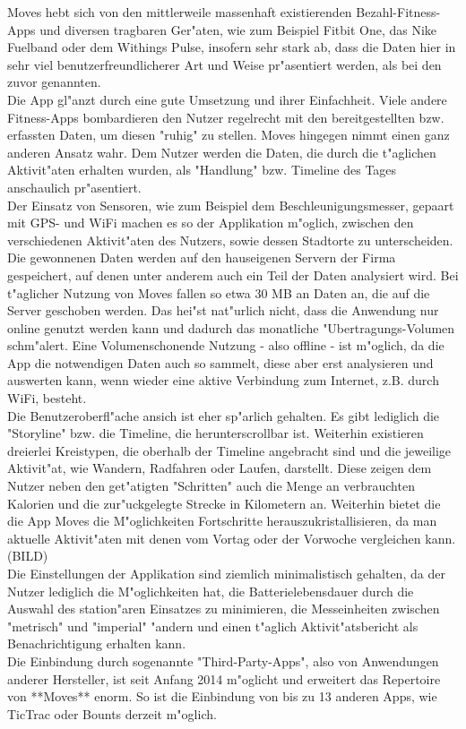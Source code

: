 Moves hebt sich von den mittlerweile massenhaft existierenden Bezahl-Fitness-Apps und diversen tragbaren Ger"aten, wie zum Beispiel Fitbit One, das Nike Fuelband oder dem Withings Pulse, insofern sehr stark ab, dass die Daten hier in sehr viel benutzerfreundlicherer Art und Weise pr"asentiert werden, als bei den zuvor genannten.
\\
Die App gl"anzt durch eine gute Umsetzung und ihrer Einfachheit. 
Viele andere Fitness-Apps bombardieren den Nutzer regelrecht mit den bereitgestellten bzw. erfassten Daten, um diesen "ruhig" zu stellen. 
Moves hingegen nimmt einen ganz anderen Ansatz wahr. 
Dem Nutzer werden die Daten, die durch die t"aglichen Aktivit"aten erhalten wurden, als "Handlung" bzw. Timeline des Tages anschaulich pr"asentiert.
\\
Der Einsatz von Sensoren, wie zum Beispiel dem Beschleunigungsmesser, gepaart mit GPS- und WiFi machen es so der Applikation m"oglich, zwischen den verschiedenen Aktivit"aten des Nutzers, sowie dessen Stadtorte zu unterscheiden. 
Die gewonnenen Daten werden auf den hauseigenen Servern der Firma gespeichert, auf denen unter anderem auch ein Teil der Daten analysiert wird. 
Bei t"aglicher Nutzung von Moves fallen so etwa 30 MB an Daten an, die auf die Server geschoben werden. 
Das hei"st nat"urlich nicht, dass die Anwendung nur online genutzt werden kann und dadurch das monatliche "Ubertragungs-Volumen schm"alert. 
Eine Volumenschonende Nutzung - also offline - ist m"oglich, da die App die notwendigen Daten auch so sammelt, diese aber erst analysieren und auswerten kann, wenn wieder eine aktive Verbindung zum Internet, z.B. durch WiFi, besteht.   
\\
Die Benutzeroberfl"ache ansich ist eher sp"arlich gehalten. 
Es gibt lediglich die "Storyline" bzw. die Timeline, die herunterscrollbar ist. 
Weiterhin existieren dreierlei Kreistypen, die oberhalb der Timeline angebracht sind und die jeweilige Aktivit"at, wie Wandern, Radfahren oder Laufen, darstellt. 
Diese zeigen dem Nutzer neben den get"atigten "Schritten" auch die Menge an verbrauchten Kalorien und die zur"uckgelegte Strecke in Kilometern an. 
Weiterhin bietet die die App Moves die M"oglichkeiten Fortschritte herauszukristallisieren, da man aktuelle Aktivit"aten mit denen vom Vortag oder der Vorwoche vergleichen kann.   
\\
(BILD)
\\
Die Einstellungen der Applikation sind ziemlich minimalistisch gehalten, da der Nutzer lediglich die M"oglichkeiten hat, die Batterielebensdauer durch die Auswahl des station"aren Einsatzes zu minimieren, die Messeinheiten zwischen "metrisch" und "imperial" "andern und einen t"aglich Aktivit"atsbericht als Benachrichtigung erhalten kann. 
\\
Die Einbindung durch sogenannte "Third-Party-Apps", also von Anwendungen anderer Hersteller, ist seit Anfang 2014 m"oglicht und erweitert das Repertoire von **Moves** enorm. 
So ist die Einbindung von bis zu 13 anderen Apps, wie TicTrac oder Bounts derzeit m"oglich.  
\\

